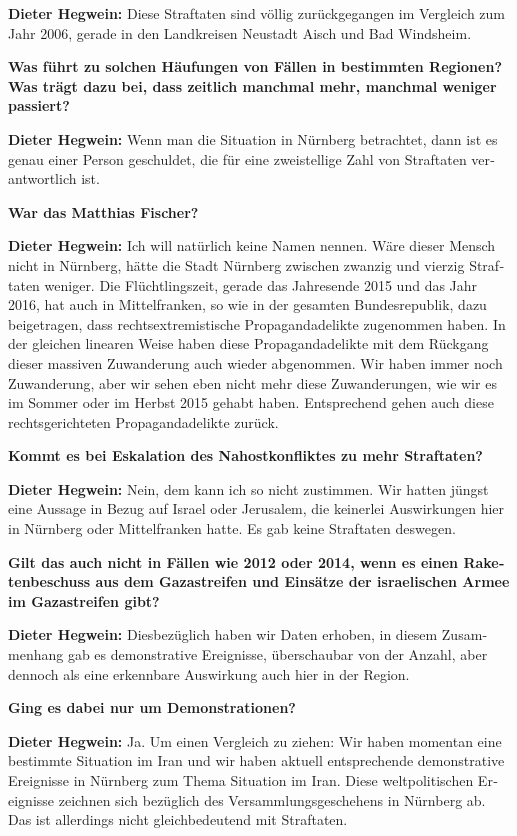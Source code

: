 \begin{otherlanguage}{ngerman}
\textbf{Dieter Hegwein:} Diese Straftaten sind völlig zurückgegangen im Vergleich zum Jahr 2006, gerade in den Landkreisen Neustadt Aisch und Bad Windsheim.

\textbf{Was führt zu solchen Häufungen von Fällen in bestimmten Regionen? Was trägt dazu bei, dass zeitlich manchmal mehr, manchmal weniger passiert?}

\textbf{Dieter Hegwein:} Wenn man die Situation in Nürnberg betrachtet, dann ist es genau einer Person geschuldet, die für eine zweistellige Zahl von Straftaten verantwortlich ist. 

\textbf{War das Matthias Fischer? }

\textbf{Dieter Hegwein:} Ich will natürlich keine Namen nennen. Wäre dieser Mensch nicht in Nürnberg, hätte die Stadt Nürnberg zwischen zwanzig und vierzig Straftaten weniger. Die Flüchtlingszeit, gerade das Jahresende 2015 und das Jahr 2016, hat auch in Mittelfranken, so wie in der gesamten Bundesrepublik, dazu beigetragen, dass rechtsextremistische Propagandadelikte zugenommen haben. In der gleichen linearen Weise haben diese Propagandadelikte mit dem Rückgang dieser massiven Zuwanderung auch wieder abgenommen. Wir haben immer noch Zuwanderung, aber wir sehen eben nicht mehr diese Zuwanderungen, wie wir es im Sommer oder im Herbst 2015 gehabt haben. Entsprechend gehen auch diese rechtsgerichteten Propagandadelikte zurück.

\textbf{Kommt es bei Eskalation des Nahostkonfliktes zu mehr Straftaten?}

\textbf{Dieter Hegwein:} Nein, dem kann ich so nicht zustimmen. Wir hatten jüngst eine Aussage in Bezug auf Israel oder Jerusalem, die keinerlei Auswirkungen hier in Nürnberg oder Mittelfranken hatte. Es gab keine Straftaten deswegen. 

\textbf{Gilt das auch nicht in Fällen wie 2012 oder 2014, wenn es einen Raketenbeschuss aus dem Gazastreifen und Einsätze der israelischen Armee im Gazastreifen gibt?}

\textbf{Dieter Hegwein:} Diesbezüglich haben wir Daten erhoben, in diesem Zusammenhang gab es demonstrative Ereignisse, überschaubar von der Anzahl, aber dennoch als eine erkennbare Auswirkung auch hier in der Region.

\textbf{Ging es dabei nur um Demonstrationen?} 

\textbf{Dieter Hegwein:} Ja. Um einen Vergleich zu ziehen: Wir haben momentan eine bestimmte Situation im Iran und wir haben aktuell entsprechende demonstrative Ereignisse in Nürnberg zum Thema Situation im Iran. Diese weltpolitischen Ereignisse zeichnen sich bezüglich des Versammlungsgeschehens in Nürnberg ab. Das ist allerdings nicht gleichbedeutend mit Straftaten.


\end{otherlanguage}
